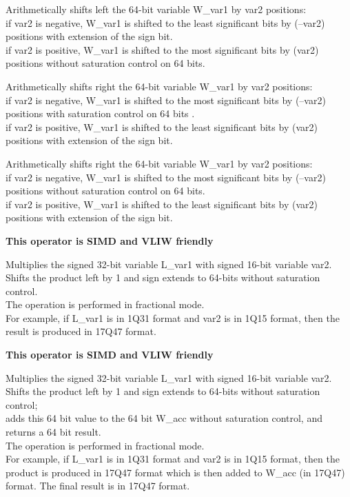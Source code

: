 Arithmetically shifts left the 64-bit variable W\_var1 by var2 positions:\\
if var2 is negative, W\_var1 is shifted to the least significant bits by (–var2) positions with extension of the sign bit.\\
if var2 is positive, W\_var1 is shifted to the most significant bits by (var2) positions without saturation control on 64 bits.



Arithmetically shifts right the 64-bit variable W\_var1 by var2 positions:\\
if var2 is negative, W\_var1 is shifted to the most significant bits by (–var2) positions with saturation control on 64 bits .\\
if var2 is positive, W\_var1 is shifted to the least significant bits by (var2) positions with extension of the sign bit.



Arithmetically shifts right the 64-bit variable W\_var1 by var2 positions:\\
if var2 is negative, W\_var1 is shifted to the most significant bits by (–var2) positions without saturation control on 64 bits.\\
if var2 is positive, W\_var1 is shifted to the least significant bits by (var2) positions with extension of the sign bit.



\textbf{ This operator is SIMD and VLIW friendly}

Multiplies the signed 32-bit variable L\_var1 with signed 16-bit variable var2.
Shifts the product left by 1 and sign extends to 64-bits without saturation control. \\
The operation is performed in fractional mode.\\
For example, if L\_var1 is in 1Q31 format and var2 is in 1Q15 format, then the result is produced in 17Q47 format.


\textbf{ This operator is SIMD and VLIW friendly}

Multiplies the signed 32-bit variable L\_var1 with signed 16-bit variable var2. 
Shifts the product left by 1 and sign extends to 64-bits without saturation control;\\
adds this 64 bit value to the 64 bit W\_acc without saturation control, and returns a 64 bit result.\\
The operation is performed in fractional mode.\\
For example, if L\_var1 is in 1Q31 format and var2 is in 1Q15 format, then the product is produced in 17Q47 format which is then added to W\_acc (in 17Q47) format.
The final result is in 17Q47 format.

